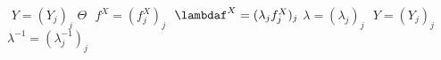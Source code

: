 \stopmpxshipout
\mpxshipout%
$ $%
\stopmpxshipout
\mpxshipout%
$Y=(Y_j)_j$%
\stopmpxshipout
\mpxshipout%
$\Theta$%
\stopmpxshipout
\mpxshipout%
$ $%
\stopmpxshipout
\mpxshipout%
$f^{X}=(f^{X}_j)_j$%
\stopmpxshipout
\mpxshipout%
$ $%
\stopmpxshipout
\mpxshipout%
$\lambdaf^{X}=(\lambda_jf^{X}_j)_j$%
\stopmpxshipout
\mpxshipout%
$\lambda=(\lambda_j)_j$%
\stopmpxshipout
\mpxshipout%
$ $%
\stopmpxshipout
\mpxshipout%
$Y=(Y_j)_j$%
\stopmpxshipout
\mpxshipout%
$\lambda^{-1}=(\lambda_j^{-1})_j$%
\stopmpxshipout

